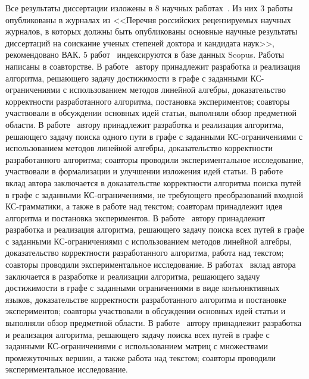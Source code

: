 
{\publications} Все результаты диссертации изложены в 8 научных работах~\cite{azimov1,azimov2,azimov3,azimov4,azimov5,azimov6,azimov7,azimov8}. Из них 3 работы~\cite{azimov6,azimov7,azimov8} опубликованы в журналах из <<Перечня российских рецензируемых научных журналов, в которых должны быть опубликованы основные научные результаты диссертаций на соискание ученых степеней доктора и кандидата наук>>, рекомендовано ВАК. 5 работ~\cite{azimov1,azimov2,azimov3,azimov4,azimov5} индексируются в базе данных Scopus. Работы~\cite{azimov1,azimov2,azimov3,azimov4,azimov6,azimov7,azimov8} написаны в соавторстве. В работе~\cite{azimov1} автору принадлежит разработка и реализация алгоритма, решающего задачу достижимости в графе с заданными КС-ограничениями с использованием методов линейной алгебры, доказательство корректности разработанного алгоритма, постановка экспериментов; соавторы участвовали в обсуждении основных идей статьи, выполняли обзор предметной области. В работе~\cite{azimov2} автору принадлежит разработка и реализация алгоритма, решающего задачу поиска одного пути в графе с заданными КС-ограничениями с использованием методов линейной алгебры, доказательство корректности разработанного алгоритма; соавторы проводили экспериментальное исследование, участвовали в формализации и улучшении изложения идей статьи. В работе~\cite{azimov3} вклад автора заключается в доказательстве корректности алгоритма поиска путей в графе с заданными КС-ограничениями, не требующего преобразований входной КС-грамматики, а также в работе над текстом; соавторам принадлежит идея алгоритма и постановка экспериментов. В работе~\cite{azimov4} автору принадлежит разработка и реализация алгоритма, решающего задачу поиска всех путей в графе с заданными КС-ограничениями с использованием методов линейной алгебры, доказательство корректности разработанного алгоритма, работа над текстом; соавторы проводили экспериментальное исследование. В работах~\cite{azimov6,azimov7} вклад автора заключается в разработке и реализации алгоритма, решающего задачу достижимости в графе с заданными ограничениями в виде конъюнктивных языков, доказательстве корректности разработанного алгоритма и постановке экспериментов; соавторы участвовали в обсуждении основных идей статьи и выполняли обзор предметной области. В работе~\cite{azimov8} автору принадлежит разработка и реализация алгоритма, решающего задачу поиска всех путей в графе с заданными КС-ограничениями с использованием матриц с множествами промежуточных вершин, а также работа над текстом; соавторы проводили экспериментальное исследование.

